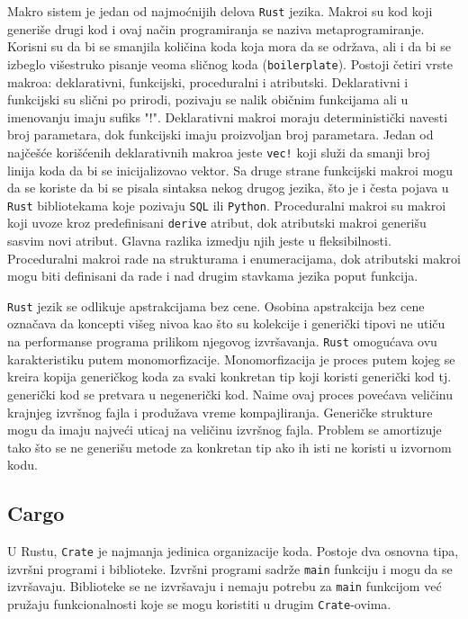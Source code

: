Makro sistem je jedan od najmoćnijih delova \verb|Rust| jezika. Makroi su kod koji generiše drugi kod i ovaj 
način programiranja se naziva metaprogramiranje. 
Korisni su da bi se smanjila količina koda koja mora da se održava, ali i da bi se izbeglo višestruko pisanje 
veoma sličnog koda (\verb|boilerplate|). Postoji četiri vrste makroa: deklarativni, funkcijski, proceduralni i atributski. 
Deklarativni i funkcijski su slični po prirodi, pozivaju se nalik običnim funkcijama ali u imenovanju imaju sufiks "!".
Deklarativni makroi moraju deterministički navesti broj parametara, dok funkcijski imaju proizvoljan broj parametara.
Jedan od najčešće korišćenih deklarativnih makroa jeste \verb|vec!| koji služi da smanji broj linija koda da bi se 
inicijalizovao vektor. Sa druge strane funkcijski makroi mogu da se koriste da bi se pisala sintaksa nekog drugog jezika, 
što je i česta pojava u \verb|Rust| bibliotekama koje pozivaju \verb|SQL| ili \verb|Python|.
Proceduralni makroi su makroi koji uvoze kroz predefinisani \verb|derive| atribut, dok atributski makroi generišu sasvim 
novi atribut. Glavna razlika izmedju njih jeste u fleksibilnosti. Proceduralni makroi rade na strukturama i enumeracijama,
dok atributski makroi mogu biti definisani da rade i nad drugim stavkama jezika poput funkcija.

\verb|Rust| jezik se odlikuje apstrakcijama bez cene. Osobina apstrakcija bez cene označava da koncepti 
višeg nivoa kao što su kolekcije i generički tipovi ne utiču na performanse programa prilikom njegovog izvršavanja.
\verb|Rust| omogućava ovu karakteristiku putem monomorfizacije. Monomorfizacija je proces putem kojeg se kreira 
kopija generičkog koda za svaki konkretan tip koji koristi generički kod tj. generički kod se pretvara u 
negenerički kod. Naime ovaj proces povećava veličinu krajnjeg izvršnog fajla i produžava vreme kompajliranja.
Generičke strukture mogu da imaju najveći uticaj na veličinu izvršnog fajla. Problem se amortizuje 
tako što se ne generišu metode za konkretan tip ako ih isti ne koristi u izvornom kodu.


\newpage
\subsection{Cargo}

U Rustu, \verb|Crate| je najmanja jedinica organizacije koda. Postoje dva osnovna tipa, izvršni programi i biblioteke.
Izvršni programi sadrže \verb|main| funkciju i mogu da se izvršavaju. Biblioteke se ne izvršavaju i nemaju potrebu za \verb|main|
funkcijom već pružaju funkcionalnosti koje se mogu koristiti u drugim \verb|Crate|-ovima. 

